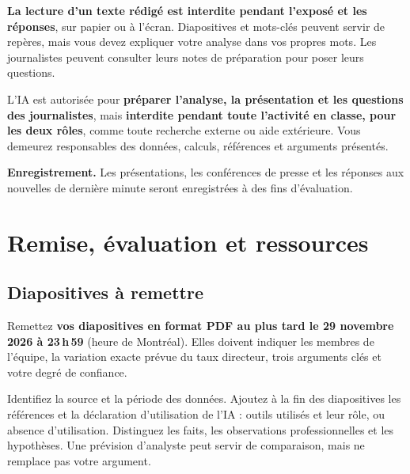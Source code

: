 \documentclass[11pt,letterpaper]{article}
\begin{document}
\textbf{La lecture d'un texte rédigé est interdite pendant l'exposé et les réponses}, sur papier ou à l'écran. Diapositives et mots-clés peuvent servir de repères, mais vous devez expliquer votre analyse dans vos propres mots. Les journalistes peuvent consulter leurs notes de préparation pour poser leurs questions.

L'IA est autorisée pour \textbf{préparer l'analyse, la présentation et les questions des journalistes}, mais \textbf{interdite pendant toute l'activité en classe, pour les deux rôles}, comme toute recherche externe ou aide extérieure. Vous demeurez responsables des données, calculs, références et arguments présentés.

\textbf{Enregistrement.} Les présentations, les conférences de presse et les réponses aux nouvelles de dernière minute seront enregistrées à des fins d'évaluation.

\newpage
\section{Remise, évaluation et ressources}
\label{modalites}

\subsection{Diapositives à remettre}
Remettez \textbf{vos diapositives en format PDF au plus tard le 29 novembre 2026 à 23\,h\,59} (heure de Montréal). Elles doivent indiquer les membres de l'équipe, la variation exacte prévue du taux directeur, trois arguments clés et votre degré de confiance.

Identifiez la source et la période des données. Ajoutez à la fin des diapositives les références et la déclaration d'utilisation de l'IA : outils utilisés et leur rôle, ou absence d'utilisation. Distinguez les faits, les observations professionnelles et les hypothèses. Une prévision d'analyste peut servir de comparaison, mais ne remplace pas votre argument.
\end{document}
